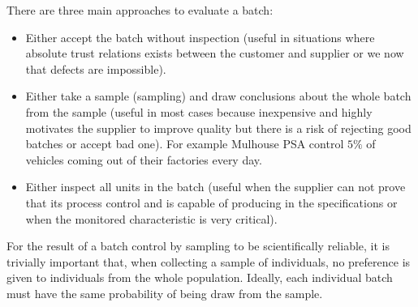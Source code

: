 	There are three main approaches to evaluate a batch:
	\begin{itemize}
		\item Either accept the batch without inspection (useful in situations where absolute trust relations exists between the customer and supplier or we now that defects are impossible).

		\item Either take a sample (sampling) and draw conclusions about the whole batch from the sample (useful in most cases because inexpensive and highly motivates the supplier to improve quality but there is a risk of rejecting good batches or accept bad one). For example Mulhouse PSA control $5\%$ of vehicles coming out of their factories every day.

		\item Either inspect all units in the batch (useful when the supplier can not prove that its process control and is capable of producing in the specifications or when the monitored characteristic is very critical).
	\end{itemize}
	For the result of a batch control by sampling to be scientifically reliable, it is trivially important that, when collecting a sample of individuals, no preference is given to individuals from the whole population. Ideally, each individual batch must have the same probability of being draw from the sample.

